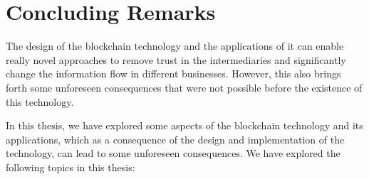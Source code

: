 
\chapter{Concluding Remarks} \label{sec:conclusion}


The design of the blockchain technology and the applications of it can enable really novel approaches to remove trust in the intermediaries and significantly change the information flow in different businesses. However, this also brings forth some unforeseen consequences that were not possible before the existence of this technology.

In this thesis, we have explored some aspects of the blockchain technology and its applications, which as a consequence of the design and implementation of the technology, can lead to some unforeseen consequences. We have explored the following topics in this thesis:  


